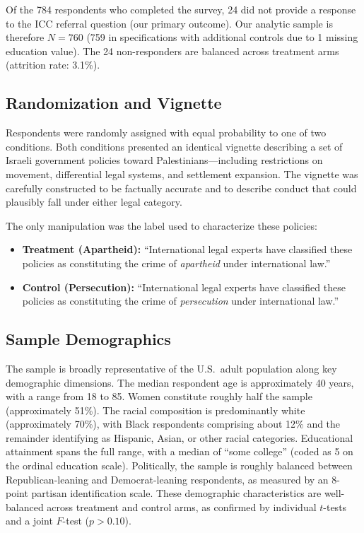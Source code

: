 \documentclass[12pt]{article}
\begin{document}
Of the 784 respondents who completed the survey, 24 did not provide a response to the ICC referral question (our primary outcome). Our analytic sample is therefore $N = 760$ (759 in specifications with additional controls due to 1 missing education value). The 24 non-responders are balanced across treatment arms (attrition rate: 3.1\%).

\subsection{Randomization and Vignette}

Respondents were randomly assigned with equal probability to one of two conditions. Both conditions presented an identical vignette describing a set of Israeli government policies toward Palestinians---including restrictions on movement, differential legal systems, and settlement expansion. The vignette was carefully constructed to be factually accurate and to describe conduct that could plausibly fall under either legal category.

The only manipulation was the label used to characterize these policies:
\begin{itemize}
    \item \textbf{Treatment (Apartheid):} ``International legal experts have classified these policies as constituting the crime of \emph{apartheid} under international law.''
    \item \textbf{Control (Persecution):} ``International legal experts have classified these policies as constituting the crime of \emph{persecution} under international law.''
\end{itemize}

\subsection{Sample Demographics}

The sample is broadly representative of the U.S.\ adult population along key demographic dimensions. The median respondent age is approximately 40 years, with a range from 18 to 85. Women constitute roughly half the sample (approximately 51\%). The racial composition is predominantly white (approximately 70\%), with Black respondents comprising about 12\% and the remainder identifying as Hispanic, Asian, or other racial categories. Educational attainment spans the full range, with a median of ``some college'' (coded as 5 on the ordinal education scale). Politically, the sample is roughly balanced between Republican-leaning and Democrat-leaning respondents, as measured by an 8-point partisan identification scale. These demographic characteristics are well-balanced across treatment and control arms, as confirmed by individual $t$-tests and a joint $F$-test ($p > 0.10$).
\end{document}
